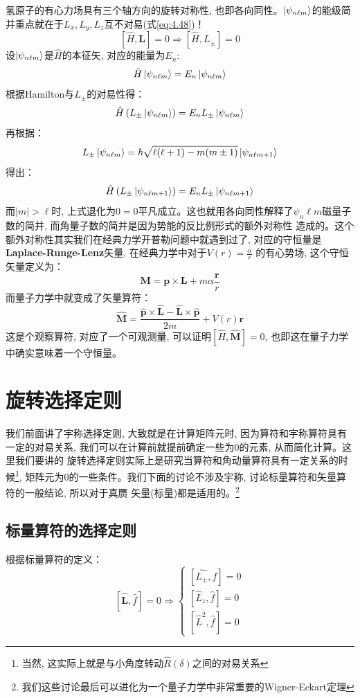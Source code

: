 \begin{thinknote}
    氢原子的有心力场具有三个轴方向的旋转对称性, 也即各向同性。$\ket{\psi_{n\ell m}}$的能级简并重点就在于$L_x,L_y,L_z$互不对易(式\ref{eq:4.48})！
    \[\left[\hat{H},\mathbf{L}\right]=0\Rightarrow\left[\hat{H},L_\pm\right]=0\]
    设$\ket{\psi_{n\ell m}}$是$\hat{H}$的本征矢, 对应的能量为$E_n$:
    \[\hat{H}\ket{\psi_{n\ell m}}=E_n\ket{\psi_{n\ell m}}\]
    根据Hamilton与$L_\pm$的对易性得：
    \[\hat{H}\left(L_\pm\ket{\psi_{n\ell m}}\right)=E_n L_\pm\ket{\psi_{n\ell m}}\]
    再根据：
    \[L_\pm \ket{\psi_{n\ell m}}=\hbar\sqrt{\ell(\ell+1)-m(m\pm 1)}\ket{\psi_{n\ell m+1}}\]
    得出：
    \[\hat{H}\left(L_\pm\ket{\psi_{n\ell m+1}}\right)=E_n L_\pm\ket{\psi_{n\ell m+1}}\]
    而$|m|>\ell$时, 上式退化为$0=0$平凡成立。这也就用各向同性解释了$\psi_n\ell m$磁量子数的简并, 而角量子数的简并是因为势能的反比例形式的额外对称性
    造成的。这个额外对称性其实我们在经典力学开普勒问题中就遇到过了, 对应的守恒量是\textbf{Laplace-Runge-Lenz}矢量, 在经典力学中对于$V(r)=\frac{\alpha}{r}$
    的有心势场, 这个守恒矢量定义为：
    \[\mathbf{M}=\mathbf{p}\times\mathbf{L}+m\alpha\frac{\mathbf{r}}{r}\]
    而量子力学中就变成了矢量算符：
    \[\hat{\mathbf{M}}=\frac{\hat{\mathbf{p}}\times\hat{\mathbf{L}}-\hat{\mathbf{L}}\times\hat{\mathbf{p}}}{2m}+V(r)\mathbf{r}\]
    这是个观察算符, 对应了一个可观测量, 可以证明$\left[\hat{H},\hat{\mathbf{M}}\right]=0$, 也即这在量子力学中确实意味着一个守恒量。
\end{thinknote}

\section{旋转选择定则}
我们前面讲了宇称选择定则, 大致就是在计算矩阵元时, 因为算符和宇称算符具有一定的对易关系, 我们可以在计算前就提前确定一些为0的元素, 从而简化计算。这里我们要讲的
旋转选择定则实际上是研究当算符和角动量算符具有一定关系的时候\footnote{当然, 这实际上就是与小角度转动$\hat{R}(\delta)$之间的对易关系}, 矩阵元为0的一些条件。我们下面的讨论不涉及宇称, 讨论标量算符和矢量算符的一般结论, 所以对于真赝
矢量(标量)都是适用的。\footnote{我们这些讨论最后可以进化为一个量子力学中非常重要的Wigner-Eckart定理}
\subsection{标量算符的选择定则}
根据标量算符的定义：
\begin{equation}
    \left[\hat{\mathbf{L}},\hat{f}\right]=0\Rightarrow\begin{cases}
        \left[\hat{L_\pm},\hat{f}\right]=0\\
        \left[\hat{L}_z,\hat{f}\right]=0\\
        \left[\hat{L}^2,\hat{f}\right]=0
    \end{cases}
\end{equation}

